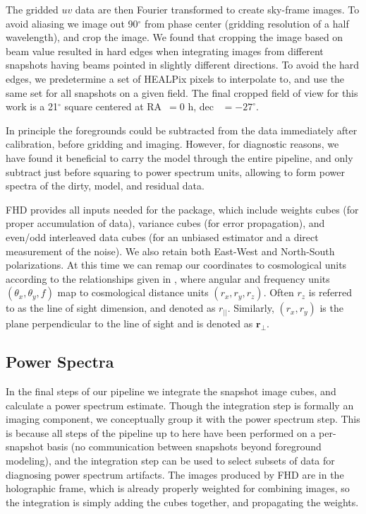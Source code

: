 \documentclass[iop]{emulateapj}
\begin{document}
The gridded $uv$ data are then Fourier transformed to create sky-frame images. To avoid 
aliasing we image out 90$^\circ$ from phase center (gridding resolution of a half 
wavelength), and crop the image. We found that cropping the image based on beam value 
resulted in hard edges when integrating images from different snapshots having beams pointed 
in slightly different directions. To avoid the hard edges, we predetermine a set of HEALPix 
pixels to interpolate to, and use the same set for all snapshots on a given field. The final 
cropped field of view for this work is a 21$^\circ$ square centered at RA~$=0$ h, dec~
$=-27^\circ$. 

In principle the foregrounds could be subtracted from the data immediately after calibration, 
before gridding and imaging. However, for diagnostic reasons, we have found it beneficial to 
carry the model through the entire pipeline, and only subtract just before squaring to power 
spectrum units, allowing to form power spectra of the dirty, model, and residual data.

FHD provides all inputs needed for the \eppsilon package, which include weights cubes (for 
proper accumulation of data), variance cubes (for error propagation), and even/odd 
interleaved data cubes (for an unbiased estimator and a direct measurement of the noise). 
We also retain both East-West and North-South polarizations. At this time we can remap 
our coordinates to cosmological units according to the relationships given in 
\citealt{Morales:2004}, where angular and frequency units $(\theta_x,\theta_y,f)$ map to 
cosmological distance units $(r_x,r_y,r_z)$. Often $r_z$ is referred to as the line of sight 
dimension, and denoted as $r_{||}$. Similarly, $(r_x,r_y)$ is the plane perpendicular to the 
line of sight and is denoted as $\mathbf{r_{\perp}}$.

\subsection{Power Spectra}
In the final steps of our pipeline we integrate the snapshot image cubes, and calculate a 
power spectrum estimate. Though the integration step is formally an imaging component, 
we conceptually group it with the power spectrum step. This is because all steps of the 
pipeline up to here have been performed on a per-snapshot basis (no communication 
between snapshots beyond foreground modeling), and the integration step can be used to 
select subsets of data for diagnosing power spectrum artifacts. The images produced by 
FHD are in the holographic frame, which is already properly weighted for combining 
images, so the integration is simply adding the cubes together, and propagating the 
weights.
\end{document}
